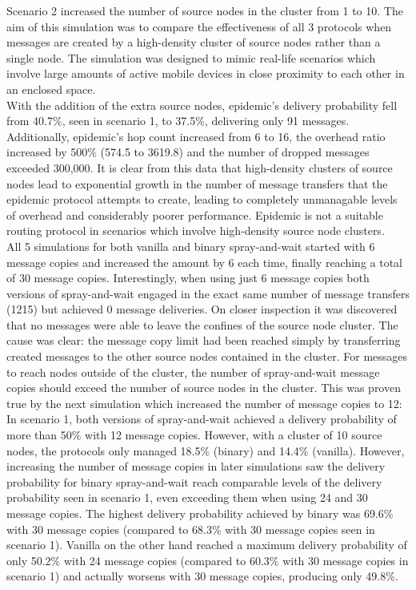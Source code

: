 \documentclass{article}
\begin{document}
\vspace{16px}
\noindent Scenario 2 increased the number of source nodes in the cluster from 1 to 10. The aim of this simulation was to compare the effectiveness of all 3 protocols when messages are created by a high-density cluster of source nodes rather than a single node. The simulation was designed to mimic real-life scenarios which involve large amounts of active mobile devices in close proximity to each other in an enclosed space.\\
\newline With the addition of the extra source nodes, epidemic's delivery probability fell from 40.7\%, seen in scenario 1, to 37.5\%, delivering only 91 messages. Additionally, epidemic's hop count increased from 6 to 16, the overhead ratio increased by 500\% (574.5 to 3619.8) and the number of dropped messages exceeded 300,000. It is clear from this data that high-density clusters of source nodes lead to exponential growth in the number of message transfers that the epidemic protocol attempts to create, leading to completely unmanagable levels of overhead and considerably poorer performance. Epidemic is not a suitable routing protocol in scenarios which involve high-density source node clusters.\\
\newline All 5 simulations for both vanilla and binary spray-and-wait started with 6 message copies and increased the amount by 6 each time, finally reaching a total of 30 message copies. Interestingly, when using just 6 message copies both versions of spray-and-wait engaged in the exact same number of message transfers (1215) but achieved 0 message deliveries. On closer inspection it was discovered that no messages were able to leave the confines of the source node cluster. The cause was clear: the message copy limit had been reached simply by transferring created messages to the other source nodes contained in the cluster. For messages to reach nodes outside of the cluster, the number of spray-and-wait message copies should exceed the number of source nodes in the cluster. This was proven true by the next simulation which increased the number of message copies to 12:\\
\newline In scenario 1, both versions of spray-and-wait achieved a delivery probability of more than 50\% with 12 message copies. However, with a cluster of 10 source nodes, the protocols only managed 18.5\% (binary) and 14.4\% (vanilla). However, increasing the number of message copies in later simulations saw the delivery probability for binary spray-and-wait reach comparable levels of the delivery probability seen in scenario 1, even exceeding them when using 24 and 30 message copies. The highest delivery probability achieved by binary was 69.6\% with 30 message copies (compared to 68.3\% with 30 message copies seen in scenario 1). Vanilla on the other hand reached a maximum delivery probability of only 50.2\% with 24 message copies (compared to 60.3\% with 30 message copies in scenario 1) and actually worsens with 30 message copies, producing only 49.8\%.\\
\end{document}
